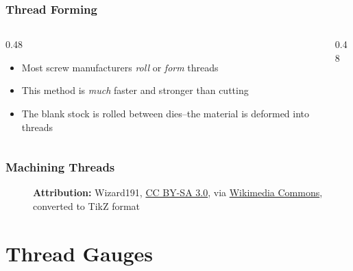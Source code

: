 \begin{frame}
	\frametitle{Thread Forming}
    \begin{columns}
        \begin{column}{0.48\linewidth}
            \begin{itemize}
                \item Most screw manufacturers \emph{roll} or \emph{form} threads
                \item This method is \emph{much} faster and stronger than cutting
                \item The blank stock is rolled between dies--the material is deformed into threads
            \end{itemize}
        \end{column}
        \begin{column}{0.48\linewidth}
        \end{column}
    \end{columns}
\end{frame}

\begin{frame}
	\frametitle{Machining Threads}

    \begin{figure}
        \centering
        \resizebox{\linewidth}{!}{
            
        }
        
        \vspace{0.5em}
        {\tiny \textbf{Attribution:} Wizard191, \href{https://creativecommons.org/licenses/by-sa/3.0/}{CC BY-SA 3.0}, via \href{https://commons.wikimedia.org/wiki/File:Thread_forming_and_rolling_concept.svg}{Wikimedia Commons}, converted to TikZ format\par}
    \end{figure}
\end{frame}

\section{Thread Gauges}

